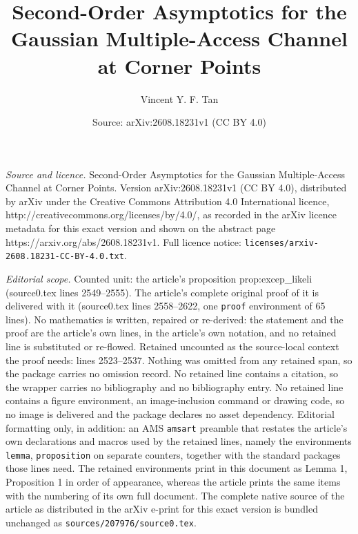 \documentclass[10pt,a4paper]{amsart}
\title{Second-Order Asymptotics for the Gaussian Multiple-Access Channel at Corner Points}
\author{Vincent Y. F. Tan}
\date{Source: arXiv:2608.18231v1 (CC BY 4.0)}
\begin{document}
\maketitle

\noindent\emph{Source and licence.} Second-Order Asymptotics for the Gaussian Multiple-Access Channel at Corner Points. Version arXiv:2608.18231v1 (CC BY 4.0), distributed by arXiv under the Creative Commons Attribution 4.0 International licence, http://creativecommons.org/licenses/by/4.0/, as recorded in the arXiv licence metadata for this exact version and shown on the abstract page https://arxiv.org/abs/2608.18231v1. Full licence notice: \texttt{licenses/arxiv-2608.18231-CC-BY-4.0.txt}.\par\smallskip

\noindent\textit{Editorial scope.} Counted unit: the article's proposition prop:excep\_likeli (source0.tex lines 2549--2555). The article's complete original proof of it is delivered with it (source0.tex lines 2558--2622, one \texttt{proof} environment of 65 lines). No mathematics is written, repaired or re-derived: the statement and the proof are the article's own lines, in the article's own notation, and no retained line is substituted or re-flowed.  Retained uncounted as the source-local context the proof needs: lines 2523--2537.  Nothing was omitted from any retained span, so the package carries no omission record.  No retained line contains a citation, so the wrapper carries no bibliography and no bibliography entry.  No retained line contains a figure environment, an image-inclusion command or drawing code, so no image is delivered and the package declares no asset dependency.  Editorial formatting only, in addition: an AMS \texttt{amsart} preamble that restates the article's own declarations and macros used by the retained lines, namely the environments \texttt{lemma}, \texttt{proposition} on separate counters, together with the standard packages those lines need.  The retained environments print in this document as Lemma 1, Proposition 1 in order of appearance, whereas the article prints the same items with the numbering of its own full document.  The complete native source of the article as distributed in the arXiv e-print for this exact version is bundled unchanged as \texttt{sources/207976/source0.tex}.
\end{document}
